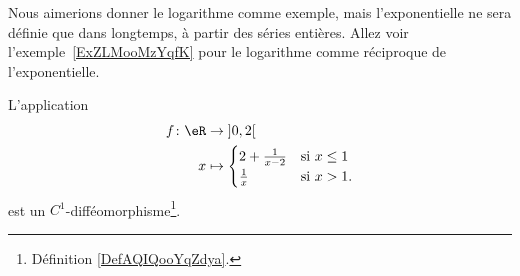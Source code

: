 Nous aimerions donner le logarithme comme exemple, mais l'exponentielle ne sera définie que dans longtemps, à partir des séries entières. Allez voir l'exemple~\ref{ExZLMooMzYqfK} pour le logarithme comme réciproque de l'exponentielle.

\begin{proposition}	\label{PROPooKPACooElwCbh}
	L'application
	\begin{equation}   \label{EQooOSPIooNWZBCa}
		\begin{aligned}
			f\colon \eR & \to \mathopen] 0,2\mathclose[ \\
			x           & \mapsto
			\begin{cases}
				2+\frac{1}{ x-2 } & \text{si } x\leq 1 \\
				\frac{1}{ x }     & \text{si } x>1.
			\end{cases}
		\end{aligned}
	\end{equation}
	est un \( C^1\)-difféomorphisme\footnote{Définition \ref{DefAQIQooYqZdya}.}.
\end{proposition}

\begin{center}
	
\end{center}

